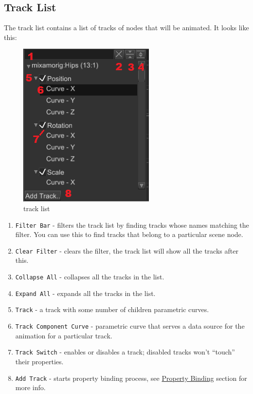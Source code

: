 \documentclass[
]{book}
\providecommand{\tightlist}{%
  \setlength{\itemsep}{0pt}\setlength{\parskip}{0pt}}
\theoremstyle{definition}
\theoremstyle{definition}
\theoremstyle{definition}
\theoremstyle{definition}
\theoremstyle{remark}
\begin{document}
\subsection{Track List}\label{track-list}

The track list contains a list of tracks of nodes that will be animated. It looks like this:

\begin{figure}
\centering
\includegraphics{images/animation/ae_track_list.png}
\caption{track list}
\end{figure}

\begin{enumerate}
\def\labelenumi{\arabic{enumi}.}
\tightlist
\item
  \texttt{Filter\ Bar} - filters the track list by finding tracks whose names matching the filter. You can use this to find tracks that belong to a particular scene node.
\item
  \texttt{Clear\ Filter} - clears the filter, the track list will show all the tracks after this.
\item
  \texttt{Collapse\ All} - collapses all the tracks in the list.
\item
  \texttt{Expand\ All} - expands all the tracks in the list.
\item
  \texttt{Track} - a track with some number of children parametric curves.
\item
  \texttt{Track\ Component\ Curve} - parametric curve that serves a data source for the animation for a particular track.
\item
  \texttt{Track\ Switch} - enables or disables a track; disabled tracks won't ``touch'' their properties.
\item
  \texttt{Add\ Track} - starts property binding process, see \hyperref[property-binding]{Property Binding} section for more info.
\end{enumerate}
\end{document}
